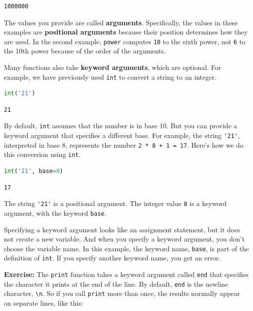 \begin{lstlisting}[]
1000000
\end{lstlisting}

The values you provide are called \textbf{arguments}. Specifically, the
values in these examples are \textbf{positional arguments} because their
position determines how they are used. In the second example,
\passthrough{\lstinline!power!} computes \passthrough{\lstinline!10!} to
the sixth power, not \passthrough{\lstinline!6!} to the 10th power
because of the order of the arguments.

Many functions also take \textbf{keyword arguments}, which are optional.
For example, we have previously used \passthrough{\lstinline!int!} to
convert a string to an integer.

\begin{lstlisting}[language=Python]
int('21')
\end{lstlisting}

\begin{lstlisting}[]
21
\end{lstlisting}

By default, \passthrough{\lstinline!int!} assumes that the number is in
base 10. But you can provide a keyword argument that specifies a
different base. For example, the string \passthrough{\lstinline!'21'!},
interpreted in base 8, represents the number
\passthrough{\lstinline!2 * 8 + 1 = 17!}. Here's how we do this
conversion using \passthrough{\lstinline!int!}.

\begin{lstlisting}[language=Python]
int('21', base=8)
\end{lstlisting}

\begin{lstlisting}[]
17
\end{lstlisting}

The string \passthrough{\lstinline!'21'!} is a positional argument. The
integer value \passthrough{\lstinline!8!} is a keyword argument, with
the keyword \passthrough{\lstinline!base!}.

Specifying a keyword argument looks like an assignment statement, but it
does not create a new variable. And when you specify a keyword argument,
you don't choose the variable name. In this example, the keyword name,
\passthrough{\lstinline!base!}, is part of the definition of
\passthrough{\lstinline!int!}. If you specify another keyword name, you
get an error.

\textbf{Exercise:} The \passthrough{\lstinline!print!} function takes a
keyword argument called \passthrough{\lstinline!end!} that specifies the
character it prints at the end of the line. By default,
\passthrough{\lstinline!end!} is the newline character,
\passthrough{\lstinline!\\n!}. So if you call
\passthrough{\lstinline!print!} more than once, the results normally
appear on separate lines, like this:


